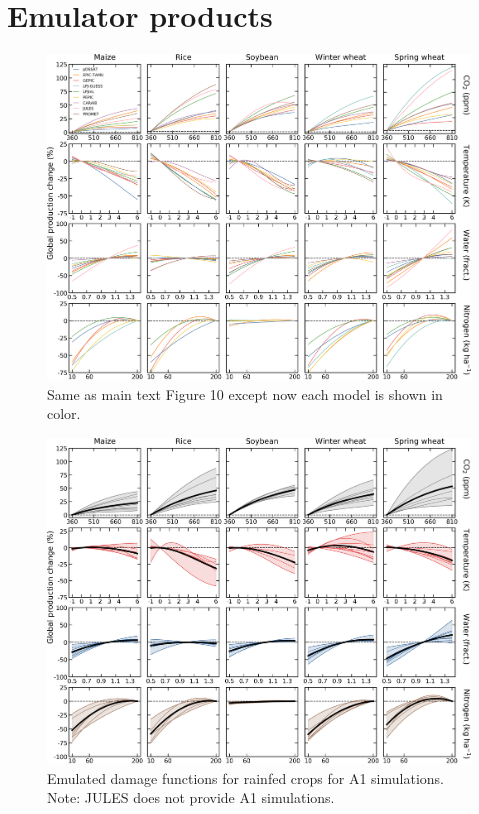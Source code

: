 \documentclass[10pt]{article}
\begin{document}
{{\section{Emulator products}
\begin{figure}[h!]
  \centering
  \includegraphics[width = 16.3cm]{em_CTWN_all_crops_color.png}
  \caption{
  Same as main text Figure 10 except now each model is shown in color.
  }
  \label{fig:all_dims}
\end{figure}

\begin{figure}[h!]
  \centering
  \includegraphics[width = 16.3cm]{em_CTWN_all_crops_A1.png}
  \caption{
  Emulated damage functions for rainfed crops for A1 simulations. Note: JULES does not provide A1 simulations.
  }
  \label{fig:all_dims}
\end{figure}

}}
\end{document}
